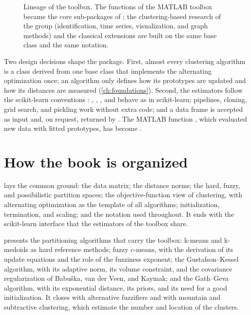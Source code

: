 \begin{figure}[htbp]
\caption[Lineage of the toolbox.]{Lineage of the toolbox. The functions of the MATLAB toolbox became the core sub-packages of ; the clustering-based research of the group (identification, time series, visualization, and graph methods) and the classical extensions are built on the same base class and the same notation.}
\label{fig:intro:lineage}
\end{figure}

Two design decisions shape the package. First, almost every clustering algorithm is a class derived from one base class that implements the alternating optimization once; an algorithm only defines how its prototypes are updated and how its distances are measured (\cref{ch:foundations}). Second, the estimators follow the scikit-learn conventions \cite{pedregosa:2011:sklearn}: , , , and  behave as in scikit-learn; pipelines, cloning, grid search, and pickling work without extra code; and a  data frame is accepted as input and, on request, returned by . The MATLAB function , which evaluated new data with fitted prototypes, has become .

\section{How the book is organized}\label{sec:intro:organisation}

 lays the common ground: the data matrix; the distance norms; the hard, fuzzy, and possibilistic partition spaces; the objective-function view of clustering, with alternating optimization as the template of all algorithms; initialization, termination, and scaling; and the notation used throughout. It ends with the scikit-learn interface that the estimators of the toolbox share.

 presents the partitioning algorithms that carry the toolbox: k-means and k-medoids as hard reference methods; fuzzy c-means, with the derivation of its update equations and the role of the fuzziness exponent; the Gustafson--Kessel algorithm, with its adaptive norm, its volume constraint, and the covariance regularization of Babu\v{s}ka, van der Veen, and Kaymak; and the Gath--Geva algorithm, with its exponential distance, its priors, and its need for a good initialization. It closes with alternative fuzzifiers and with mountain and subtractive clustering, which estimate the number and location of the clusters.

